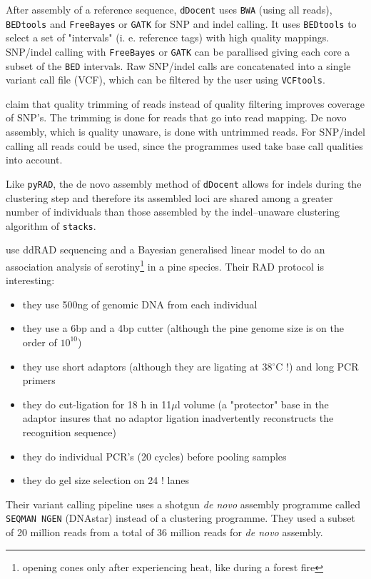 \documentclass{article}\usepackage[]{graphicx}\usepackage[]{color}
\begin{document}
After assembly of a reference sequence, \texttt{dDocent} uses \texttt{BWA} (using all reads), \texttt{BEDtools} and \texttt{FreeBayes} \citep{Garrison2012} or \texttt{GATK} for SNP and indel calling. It uses \texttt{BEDtools} to select a set of "intervals" (i. e. reference tags) with high quality mappings. SNP/indel calling with \texttt{FreeBayes} or \texttt{GATK} can be parallised giving each core a subset of the \texttt{BED} intervals. Raw SNP/indel calls are concatenated into a single variant call file (VCF), which can be filtered by the user using \texttt{VCFtools}.

\cite{Puritz2014a} claim that quality trimming of reads instead of quality filtering improves coverage of SNP's. The trimming is done for reads that go into read mapping. De novo assembly, which is quality unaware, is done with untrimmed reads. For SNP/indel calling all reads could be used, since the programmes used take base call qualities into account.

Like \texttt{pyRAD}, the de novo assembly method of \texttt{dDocent} allows for \glspl{indel} during the clustering step and therefore its assembled loci are shared among a greater number of individuals than those assembled by the indel--unaware clustering algorithm of \texttt{stacks}.


\cite{Parchman2012} use \gls{ddRAD} sequencing and a Bayesian generalised linear model to do an association analysis of serotiny\footnote{opening cones only after experiencing heat, like during a forest fire} in a pine species. Their RAD protocol is interesting:
\begin{itemize}
\item they use 500ng of genomic DNA from each individual
\item they use a 6bp and a 4bp cutter (although the pine genome size is on the order of $10^{10}$)
\item they use short adaptors (although they are ligating at 38$^{\circ}$C !) and long PCR primers
\item they do cut-ligation for 18 h in 11$\mu$l volume (a "protector" base in the adaptor insures that no adaptor ligation inadvertently reconstructs the recognition sequence)
\item they do individual PCR's (20 cycles) before pooling samples
\item they do gel size selection on 24 ! lanes
\end{itemize}

Their variant calling pipeline uses a shotgun \emph{de novo} assembly programme called \texttt{SEQMAN NGEN} (DNAstar) instead of a clustering programme. They used a subset of 20 million reads from a total of 36 million reads for \emph{de novo} assembly.
\end{document}
